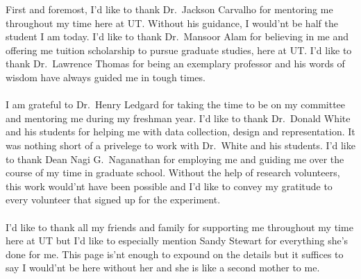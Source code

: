 \documentclass[12pt]{uthesis-v12}  %
\begin{document}

\begin{acknowledgments}
\noindent First and foremost, I'd like to thank Dr.~Jackson Carvalho for mentoring me throughout my time here at UT. Without his guidance, I would'nt be half the student I am today. I'd like to thank Dr.~Mansoor Alam for believing in me and offering me tuition scholarship to pursue graduate studies, here at UT. I'd like to thank Dr.~Lawrence Thomas for being an exemplary professor and his words of wisdom have always guided me in tough times.\\\\I am grateful to Dr.~Henry Ledgard for taking the time to be on my committee and mentoring me during my freshman year. I'd like to thank Dr.~Donald White and his students for helping me with data collection, design and representation. It was nothing short of a privelege to work with Dr.~White and his students. I'd like to thank Dean Nagi G.~Naganathan for employing me and guiding me over the course of my time in graduate school. Without the help of research volunteers, this work would'nt have been possible and I'd like to convey my gratitude to every volunteer that signed up for the experiment.\\\\
I'd like to thank all my friends and family for supporting me throughout my time here at UT but I'd like to especially mention Sandy Stewart for everything she's done for me. This page is'nt enough to expound on the details but it suffices to say I would'nt be here without her and she is like a second mother to me.  
\end{acknowledgments}
\end{document}
